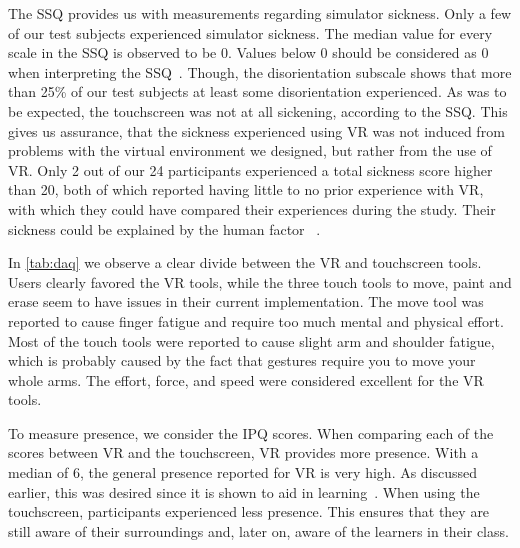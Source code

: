 The SSQ provides us with measurements regarding simulator sickness. Only a few of our test subjects experienced simulator sickness. The median value for every scale in the SSQ is observed to be 0. Values below 0 should be considered as 0 when interpreting the SSQ~\cite{ssqFix}. Though, the disorientation subscale shows that more than 25\% of our test subjects at least some disorientation experienced. As was to be expected, the touchscreen was not at all sickening, according to the SSQ. This gives us assurance, that the sickness experienced using VR was not induced from problems with the virtual environment we designed, but rather from the use of VR. Only 2 out of our 24 participants experienced a total sickness score higher than 20, both of which reported having little to no prior experience with VR, with which they could have compared their experiences during the study. Their sickness could be explained by the human factor ~\cite{vrSicknessReasons}.

In \autoref{tab:daq} we observe a clear divide between the VR and touchscreen tools. Users clearly favored the VR tools, while the three touch tools to move, paint and erase seem to have issues in their current implementation. The move tool was reported to cause finger fatigue and require too much mental and physical effort. Most of the touch tools were reported to cause slight arm and shoulder fatigue, which is probably caused by the fact that gestures require you to move your whole arms. The effort, force, and speed were considered excellent for the VR tools.

To measure presence, we consider the IPQ scores. When comparing each of the scores between VR and the touchscreen, VR provides more presence. With a median of 6, the general presence reported for VR is very high. As discussed earlier, this was desired since it is shown to aid in learning~\cite{presenceLearning}. When using the touchscreen, participants experienced less presence. This ensures that they are still aware of their surroundings and, later on, aware of the learners in their class.

